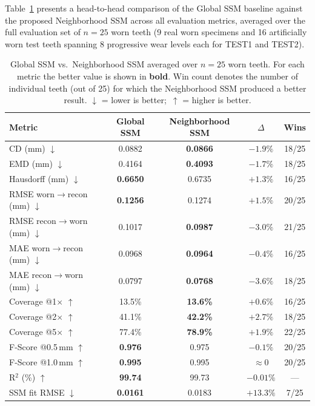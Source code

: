 \documentclass[11pt,a4paper]{article}
\begin{document}
Table~\ref{tab:globalvslocal} presents a head-to-head comparison of
the Global SSM baseline against the proposed Neighborhood SSM across
all evaluation metrics, averaged over the full evaluation set of
$n=25$ worn teeth (9 real worn specimens and 16 artificially worn
test teeth spanning 8 progressive wear levels each for TEST1 and
TEST2).

\begin{table}[ht]
\centering
\caption{Global SSM vs.\ Neighborhood SSM averaged over $n=25$
  worn teeth.
  For each metric the better value is shown in \textbf{bold}.
  Win count denotes the number of individual teeth (out of 25) for
  which the Neighborhood SSM produced a better result.
  $\downarrow$ = lower is better;~$\uparrow$ = higher is better.}
\label{tab:globalvslocal}
\setlength{\tabcolsep}{6pt}
\renewcommand{\arraystretch}{1.25}
\begin{tabular}{lcccc}
\toprule
\textbf{Metric} &
  \textbf{Global SSM} &
  \textbf{Neighborhood SSM} &
  \textbf{$\Delta$} &
  \textbf{Wins} \\
\midrule
CD (mm) $\downarrow$
  & 0.0882 & \textbf{0.0866} & $-1.9\%$ & 18/25 \\
EMD (mm) $\downarrow$
  & 0.4164 & \textbf{0.4093} & $-1.7\%$ & 18/25 \\
Hausdorff (mm) $\downarrow$
  & \textbf{0.6650} & 0.6735 & $+1.3\%$ & 16/25 \\
RMSE worn$\to$recon (mm) $\downarrow$
  & \textbf{0.1256} & 0.1274 & $+1.5\%$ & 20/25 \\
RMSE recon$\to$worn (mm) $\downarrow$
  & 0.1017 & \textbf{0.0987} & $-3.0\%$ & 21/25 \\
MAE worn$\to$recon (mm) $\downarrow$
  & 0.0968 & \textbf{0.0964} & $-0.4\%$ & 16/25 \\
MAE recon$\to$worn (mm) $\downarrow$
  & 0.0797 & \textbf{0.0768} & $-3.6\%$ & 18/25 \\
Coverage @1$\times$ $\uparrow$
  & 13.5\% & \textbf{13.6\%} & $+0.6\%$ & 16/25 \\
Coverage @2$\times$ $\uparrow$
  & 41.1\% & \textbf{42.2\%} & $+2.7\%$ & 18/25 \\
Coverage @5$\times$ $\uparrow$
  & 77.4\% & \textbf{78.9\%} & $+1.9\%$ & 22/25 \\
F-Score @0.5\,mm $\uparrow$
  & \textbf{0.976} & 0.975 & $-0.1\%$ & 20/25 \\
F-Score @1.0\,mm $\uparrow$
  & \textbf{0.995} & 0.995 & $\approx 0$ & 20/25 \\
R$^2$ (\%) $\uparrow$
  & \textbf{99.74} & 99.73 & $-0.01\%$ & --- \\
SSM fit RMSE $\downarrow$
  & \textbf{0.0161} & 0.0183 & $+13.3\%$ & 7/25 \\
\bottomrule
\end{tabular}
\end{table}
\end{document}

